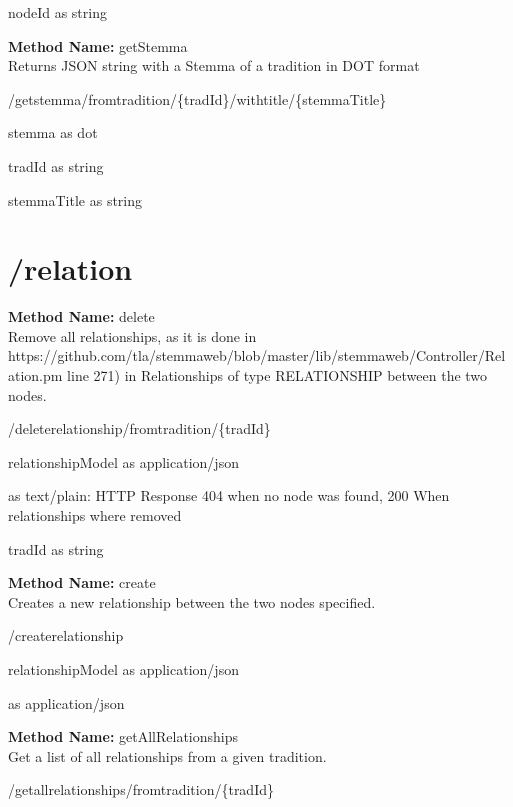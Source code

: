 \begin{parameter}
nodeId as string
\end{parameter}
\textbf{Method Name: }getStemma \\ Returns JSON string with a Stemma of a tradition in DOT format
\begin{get}
/getstemma/fromtradition/\{tradId\}/withtitle/\{stemmaTitle\}
\end{get}
\begin{response}
stemma as dot
\end{response}
\begin{parameter}
tradId as string
\end{parameter}
\begin{parameter}
stemmaTitle as string
\end{parameter}
\section{/relation}
\textbf{Method Name: }delete \\ Remove all relationships, as it is done in https://github.com/tla/stemmaweb/blob/master/lib/stemmaweb/Controller/Relation.pm line 271) in Relationships of type RELATIONSHIP between the two nodes.
\begin{post}
/deleterelationship/fromtradition/\{tradId\}
\end{post}
\begin{request}
relationshipModel as application/json
\end{request}
\begin{response}
 as text/plain: HTTP Response 404 when no node was found, 200 When relationships where removed
\end{response}
\begin{parameter}
tradId as string
\end{parameter}
\textbf{Method Name: }create \\ Creates a new relationship between the two nodes specified.
\begin{post}
/createrelationship
\end{post}
\begin{request}
relationshipModel as application/json
\end{request}
\begin{response}
 as application/json
\end{response}
\textbf{Method Name: }getAllRelationships \\ Get a list of all relationships from a given tradition.
\begin{get}
/getallrelationships/fromtradition/\{tradId\}
\end{get}
